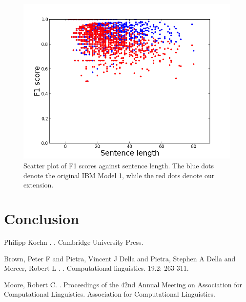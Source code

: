 \documentclass[11pt]{article}
\begin{document}
\begin{figure}[h]
  \centering
  \centerline{\includegraphics[width=\columnwidth]{graph.png}}
\caption{Scatter plot of F1 scores against sentence length. The blue dots denote the original IBM Model 1, while the red dots denote our extension.}
  \label{fig:features}
\end{figure}

\section{Conclusion}
\label{Concl}

\begin{thebibliography}{}

Philipp Koehn
.
.
\newblock Cambridge University Press.

Brown, Peter F and Pietra, Vincent J Della and Pietra, Stephen A Della and Mercer, Robert L
.
.
\newblock Computational linguistics. 19.2: 263-311.

Moore, Robert C.
.
\newblock Proceedings of the 42nd Annual Meeting on Association for Computational Linguistics. Association for Computational Linguistics.

\end{thebibliography}
\end{document}
